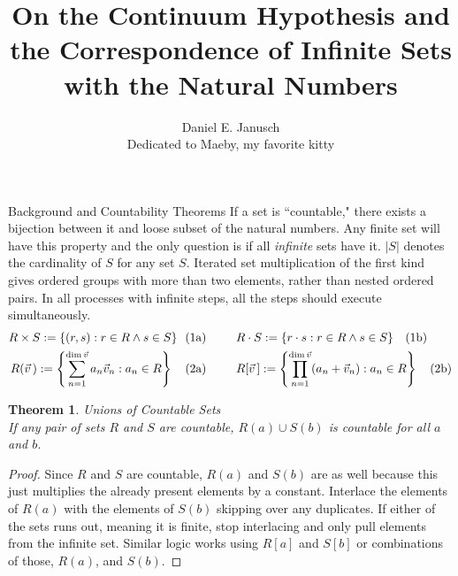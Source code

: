 \documentclass[12pt]{article}
\newtheorem{thm}{Theorem}
\begin{document}
\title{On the Continuum Hypothesis and the Correspondence of Infinite Sets with the Natural Numbers}
\author{Daniel E. Janusch\\Dedicated to Maeby, my favorite kitty}
\maketitle

\begin{section}{Background and Countability Theorems}\label{sec:background}
	If a set is ``countable," there exists a bijection between it and loose subset of
	the natural numbers. Any finite set will have this property and the only question
	is if all \emph{infinite} sets have it. $|S|$ denotes the cardinality of $S$ for
	any set $S$. Iterated set multiplication of the first kind gives ordered groups
	with more than two elements, rather than nested ordered pairs. In all processes
	with infinite steps, all the steps should execute simultaneously.\vspace{-1em}\\
	\begin{align}
		R\times S :=\{(r,s):r\in R\land s\in S\}~~(1 & \text a)
		\hspace{2.5em}
		R\cdot S :=\{r\cdot s:r\in R\land s\in S\}~~~(1\text b)
		\\
		R(\vec v\,):=\left\{\sum_{n=1}^{\dim\vec v}a_n\vec v_n:a_n\in R\right\}~~~(2 & \text a)
		\hspace{2.5em}
		R[\vec v\,]:=\left\{\prod_{n=1}^{\dim\vec v}(a_n+\vec v_n):a_n\in R\right\}~~~(2\text b)
	\end{align}

	\begin{thm}\label{thm:finite unions}
		\emph{Unions of Countable Sets}\\
		\indent\emph{If any pair of sets $R$ and $S$ are countable, $R(a)\cup S(b)$ is countable for all $a$ and $b$.}
	\end{thm}\begin{proof}
		Since $R$ and $S$ are countable, $R(a)$ and $S(b)$ are as well because this just
		multiplies the already present elements by a constant. Interlace the elements of
		$R(a)$ with the elements of $S(b)$ skipping over any duplicates. If either of the
		sets runs out, meaning it is finite, stop interlacing and only pull elements from
		the infinite set. Similar logic works using $R[a]$ and $S[b]$ or combinations of
		those, $R(a)$, and $S(b)$.
	\end{proof}


\end{section}
\end{document}
